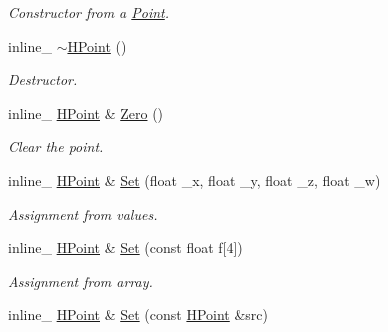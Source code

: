 \begin{DoxyCompactItemize}
\begin{DoxyCompactList}\small\item\em Constructor from a \hyperlink{class_point}{Point}. \end{DoxyCompactList}\item 
\hypertarget{class_h_point_af759f777bf37fff8a540bf28f6d763ae}{inline\+\_\+ \hyperlink{class_h_point_af759f777bf37fff8a540bf28f6d763ae}{$\sim$\+H\+Point} ()}\label{class_h_point_af759f777bf37fff8a540bf28f6d763ae}

\begin{DoxyCompactList}\small\item\em Destructor. \end{DoxyCompactList}\item 
\hypertarget{class_h_point_a23b827b1070296cd7a14663c8dc138fc}{inline\+\_\+ \hyperlink{class_h_point}{H\+Point} \& \hyperlink{class_h_point_a23b827b1070296cd7a14663c8dc138fc}{Zero} ()}\label{class_h_point_a23b827b1070296cd7a14663c8dc138fc}

\begin{DoxyCompactList}\small\item\em Clear the point. \end{DoxyCompactList}\item 
\hypertarget{class_h_point_a6bc4170ff94bceba2b87e6e808eaec5f}{inline\+\_\+ \hyperlink{class_h_point}{H\+Point} \& \hyperlink{class_h_point_a6bc4170ff94bceba2b87e6e808eaec5f}{Set} (float \+\_\+x, float \+\_\+y, float \+\_\+z, float \+\_\+w)}\label{class_h_point_a6bc4170ff94bceba2b87e6e808eaec5f}

\begin{DoxyCompactList}\small\item\em Assignment from values. \end{DoxyCompactList}\item 
\hypertarget{class_h_point_abcf02d3721448daad95a079045e533bb}{inline\+\_\+ \hyperlink{class_h_point}{H\+Point} \& \hyperlink{class_h_point_abcf02d3721448daad95a079045e533bb}{Set} (const float f\mbox{[}4\mbox{]})}\label{class_h_point_abcf02d3721448daad95a079045e533bb}

\begin{DoxyCompactList}\small\item\em Assignment from array. \end{DoxyCompactList}\item 
\hypertarget{class_h_point_a1e94bdece89d1aac96f95df9ebd79eaf}{inline\+\_\+ \hyperlink{class_h_point}{H\+Point} \& \hyperlink{class_h_point_a1e94bdece89d1aac96f95df9ebd79eaf}{Set} (const \hyperlink{class_h_point}{H\+Point} \&src)}\label{class_h_point_a1e94bdece89d1aac96f95df9ebd79eaf}


\end{DoxyCompactItemize}
